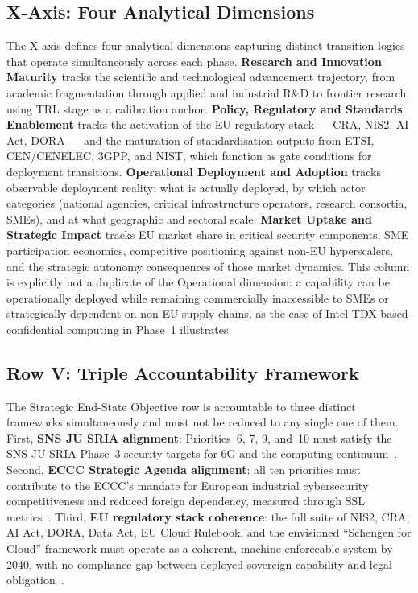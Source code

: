 \subsection*{X-Axis: Four Analytical Dimensions}

The X-axis defines four analytical dimensions capturing distinct transition
logics that operate simultaneously across each phase. \textbf{Research and
Innovation Maturity} tracks the scientific and technological advancement
trajectory, from academic fragmentation through applied and industrial R\&D
to frontier research, using TRL stage as a calibration anchor.
\textbf{Policy, Regulatory and Standards Enablement} tracks the activation
of the EU regulatory stack --- CRA, NIS2, AI Act, DORA --- and the maturation
of standardisation outputs from ETSI, CEN/CENELEC, 3GPP, and NIST, which
function as gate conditions for deployment transitions. \textbf{Operational
Deployment and Adoption} tracks observable deployment reality: what is
actually deployed, by which actor categories (national agencies, critical
infrastructure operators, research consortia, SMEs), and at what geographic
and sectoral scale. \textbf{Market Uptake and Strategic Impact} tracks EU
market share in critical security components, SME participation economics,
competitive positioning against non-EU hyperscalers, and the strategic
autonomy consequences of those market dynamics. This column is explicitly
not a duplicate of the Operational dimension: a capability can be
operationally deployed while remaining commercially inaccessible to SMEs or
strategically dependent on non-EU supply chains, as the case of Intel-TDX-based
confidential computing in Phase~1 illustrates.

\subsection*{Row V: Triple Accountability Framework}

The Strategic End-State Objective row is accountable to three distinct
frameworks simultaneously and must not be reduced to any single one of them.
First, \textbf{SNS JU SRIA alignment}: Priorities~6, 7, 9, and~10 must
satisfy the SNS JU SRIA Phase~3 security targets for 6G and the computing
continuum~\cite{snsju}. Second, \textbf{ECCC Strategic Agenda alignment}:
all ten priorities must contribute to the ECCC's mandate for European
industrial cybersecurity competitiveness and reduced foreign dependency,
measured through SSL metrics~\cite{eccc}. Third, \textbf{EU regulatory
stack coherence}: the full suite of NIS2, CRA, AI Act, DORA, Data Act, EU
Cloud Rulebook, and the envisioned ``Schengen for Cloud'' framework must
operate as a coherent, machine-enforceable system by 2040, with no
compliance gap between deployed sovereign capability and legal
obligation~\cite{nis2,cra,aiact}.


